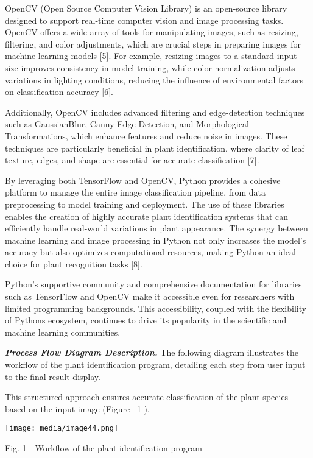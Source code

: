 \documentclass[
]{article}
\begin{document}
OpenCV (Open Source Computer Vision Library) is an open-source library
designed to support real-time computer vision and image processing
tasks. OpenCV offers a wide array of tools for manipulating images, such
as resizing, filtering, and color adjustments, which are crucial steps
in preparing images for machine learning models {[}5{]}. For example,
resizing images to a standard input size improves consistency in model
training, while color normalization adjusts variations in lighting
conditions, reducing the influence of environmental factors on
classification accuracy {[}6{]}.

Additionally, OpenCV includes advanced filtering and edge-detection
techniques such as GaussianBlur, Canny Edge Detection, and Morphological
Transformations, which enhance features and reduce noise in images.
These techniques are particularly beneficial in plant identification,
where clarity of leaf texture, edges, and shape are essential for
accurate classification {[}7{]}.

By leveraging both TensorFlow and OpenCV, Python provides a cohesive
platform to manage the entire image classification pipeline, from data
preprocessing to model training and deployment. The use of these
libraries enables the creation of highly accurate plant identification
systems that can efficiently handle real-world variations in plant
appearance. The synergy between machine learning and image processing in
Python not only increases the model's accuracy but also optimizes
computational resources, making Python an ideal choice for plant
recognition tasks {[}8{]}.

Python's supportive community and comprehensive documentation for
libraries such as TensorFlow and OpenCV make it accessible even for
researchers with limited programming backgrounds. This accessibility,
coupled with the flexibility of Python\textquotesingle s ecosystem,
continues to drive its popularity in the scientific and machine learning
communities.

\emph{\textbf{Process Flow Diagram Description.}} The following diagram
illustrates the workflow of the plant identification program, detailing
each step from user input to the final result display.

This structured approach ensures accurate classification of the plant
species based on the input image (Figure --1 ).

\texttt{[image: media/image44.png]}

Fig. 1 - Workflow of the plant identification program
\end{document}
